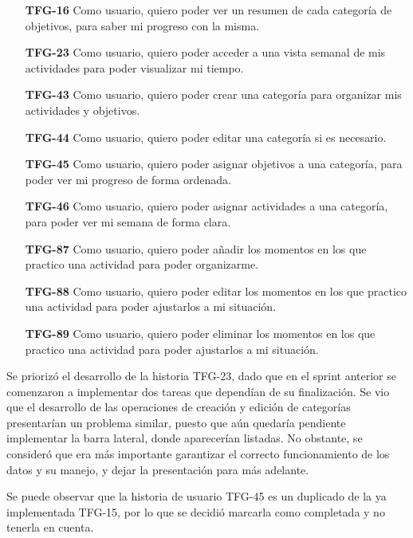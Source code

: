 \documentclass[10pt, a4paper]{aqademic}
\begin{document}
\begin{itemize}[leftmargin=16mm]
	\item [\textbf{TFG-16}] Como usuario, quiero poder ver un resumen de cada categoría de objetivos, para saber mi progreso con la misma.
	
	\item [\textbf{TFG-23}] Como usuario, quiero poder acceder a una vista semanal de mis actividades para poder visualizar mi tiempo.
	
	\item [\textbf{TFG-43}] Como usuario, quiero poder crear una categoría para organizar mis actividades y objetivos.
	
	\item [\textbf{TFG-44}] Como usuario, quiero poder editar una categoría si es necesario.
	
	\item [\textbf{TFG-45}] Como usuario, quiero poder asignar objetivos a una categoría, para poder ver mi progreso de forma ordenada.
	
	\item [\textbf{TFG-46}] Como usuario, quiero poder asignar actividades a una categoría, para poder ver mi semana de forma clara.
	
	\item [\textbf{TFG-87}] Como usuario, quiero poder añadir los momentos en los que practico una actividad para poder organizarme.
	
	\item [\textbf{TFG-88}] Como usuario, quiero poder editar los momentos en los que practico una actividad para poder ajustarlos a mi situación.
	
	\item [\textbf{TFG-89}] Como usuario, quiero poder eliminar los momentos en los que practico una actividad para poder ajustarlos a mi situación.
\end{itemize}

Se priorizó el desarrollo de la historia TFG-23, dado que en el sprint anterior se comenzaron a implementar dos tareas que dependían de su finalización. Se vio que el desarrollo de las operaciones de creación y edición de categorías presentarían un problema similar, puesto que aún quedaría pendiente implementar la barra lateral, donde aparecerían listadas. No obstante, se consideró que era más importante garantizar el correcto funcionamiento de los datos y su manejo, y dejar la presentación para más adelante.

Se puede observar que la historia de usuario TFG-45 es un duplicado de la ya implementada TFG-15, por lo que se decidió marcarla como completada y no tenerla en cuenta.
\end{document}
